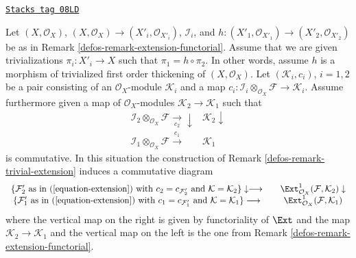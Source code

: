 \begin{remark}
\label{defos-remark-trivial-extension-functorial}
\href{https://stacks.math.columbia.edu/tag/08LD}{\texttt{Stacks tag 08LD}}

Let $(X, \mathcal{O}_X)$, $(X, \mathcal{O}_X) \to (X'_i, \mathcal{O}_{X'_i})$,
$\mathcal{I}_i$, and
$h : (X'_1, \mathcal{O}_{X'_1}) \to (X'_2, \mathcal{O}_{X'_2})$
be as in Remark \ref{defos-remark-extension-functorial}. Assume that we are
given trivializations $\pi_i : X'_i \to X$ such that
$\pi_1 = h \circ \pi_2$. In other words, assume $h$ is a morphism
of trivialized first order thickening of $(X, \mathcal{O}_X)$. Let
$(\mathcal{K}_i, c_i)$, $i = 1, 2$ be a pair consisting of an
$\mathcal{O}_X$-module $\mathcal{K}_i$ and a map
$c_i : \mathcal{I}_i \otimes_{\mathcal{O}_X} \mathcal{F} \to
\mathcal{K}_i$. Assume furthermore given a map
of $\mathcal{O}_X$-modules $\mathcal{K}_2 \to \mathcal{K}_1$
such that
$$
\begin{array}{cc}\mathcal{I}_2 \otimes_{\mathcal{O}_X} \mathcal{F}
\underset{c_2}{\longrightarrow}\downarrow & \mathcal{K}_2 \downarrow \\ \mathcal{I}_1 \otimes_{\mathcal{O}_X} \mathcal{F}
\overset{c_1}{\longrightarrow} & \mathcal{K}_1\end{array}
$$
is commutative. In this situation the construction of
Remark \ref{defos-remark-trivial-extension} induces
a commutative diagram
$$
\begin{array}{ccc}\{\mathcal{F}'_2\text{ as in (\ref{equation-extension}) with }
c_2 = c_{\mathcal{F}'_2}\text{ and }\mathcal{K} = \mathcal{K}_2\}
\downarrow\longrightarrow &  & \Ext^1_{\mathcal{O}_X}(\mathcal{F}, \mathcal{K}_2) \downarrow \\ \{\mathcal{F}'_1\text{ as in (\ref{equation-extension}) with }
c_1 = c_{\mathcal{F}'_1}\text{ and }\mathcal{K} = \mathcal{K}_1\}
\longrightarrow &  & \Ext^1_{\mathcal{O}_X}(\mathcal{F}, \mathcal{K}_1)\end{array}
$$
where the vertical map on the right is given by functoriality of $\Ext$
and the map $\mathcal{K}_2 \to \mathcal{K}_1$ and the vertical map on the left
is the one from Remark \ref{defos-remark-extension-functorial}.
\end{remark}

